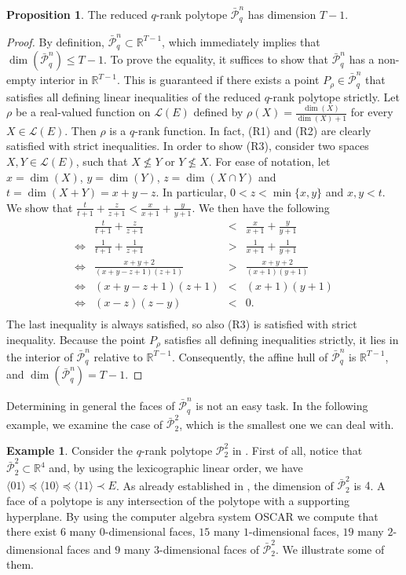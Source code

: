 \documentclass[a4paper,11pt,reqno]{amsart}
\theoremstyle{definition}
\newtheorem{example}[theorem]{{{Example}}}
\newtheorem{proposition}[theorem]{{{Proposition}}}
\newcommand{\mL}{\mathcal{L}}
\newcommand{\mP}{\mathcal{P}}
\newcommand{\la}{\langle}
\newcommand{\ra}{\rangle}
\newcommand{\rRP}{\bar{\mathcal{P}}_q^n}
\begin{document}
{\begin{proposition}\label{prop:dimension}
The reduced $q$-rank polytope $\rRP$ has dimension $T-1$.
\end{proposition}
\begin{proof}
By definition, $\rRP \subset \mathbb{R}^{T-1}$, which immediately implies that $\dim(\rRP) \le T-1$. To prove the equality, it suffices to show that $\rRP$ has a non-empty interior in $\mathbb{R}^{T-1}$. This is guaranteed if there exists a point $P_\rho \in \rRP$ that satisfies all defining linear inequalities of the reduced $q$-rank polytope strictly.
Let $\rho$ be a real-valued function on $\mL(E)$ defined by $\rho(X)=\frac{\dim(X)}{\dim(X)+1}$ for every $X\in\mL(E)$. Then $\rho$ is a $q$-rank function. In fact, (R1) and (R2) are clearly satisfied with strict inequalities. In order to show (R3), consider two spaces $X,Y\in\mL(E)$, such that $X\nleq Y$ or $Y\nleq X$. For ease of notation, let $x=\dim(X)$, $y=\dim(Y)$, $z=\dim(X\cap Y)$ and $t=\dim(X+Y) = x+y-z$. In particular, $0< z< \min\{x,y\}$ and $x,y<t$. We show that 
$\frac{t}{t+1} + \frac{z}{z+1} < \frac{x}{x+1} + \frac{y}{y+1}.$
We then have the following 
$$\begin{array}{cccc}
    & \frac{t}{t+1} + \frac{z}{z+1} & < & \frac{x}{x+1} + \frac{y}{y+1} \\
    \Leftrightarrow & \frac{1}{t+1} + \frac{1}{z+1} & > &\frac{1}{x+1} + \frac{1}{y+1}\\
    \Leftrightarrow & \frac{x+y+2}{(x+y-z+1)(z+1)} &> & \frac{x+y+2}{(x+1)(y+1)}\\
    \Leftrightarrow & (x+y-z+1)(z+1) &< &(x+1)(y+1)\\
    \Leftrightarrow & (x-z)(z-y) &<& 0.\\
\end{array}$$
The last inequality is always satisfied, so also (R3) is satisfied with strict inequality. 
Because the point $P_\rho$ satisfies all defining inequalities strictly, it lies in the interior of $\rRP$ relative to $\mathbb{R}^{T-1}$. Consequently, the affine hull of $\rRP$ is $\mathbb{R}^{T-1}$, and $\dim(\rRP) = T-1$.
\end{proof}


Determining in general the faces of $\rRP$ is not an easy task. In the following example, we examine the case of $\bar{\mathcal{P}}_2^2$, which is the smallest one we can deal with.

\begin{example}
Consider the $q$-rank polytope $\mP_2^2$ in . First of all, notice that $\bar{\mathcal{P}}_2^2\subset\mathbb{R}^4$ and, by using the lexicographic linear order, we have $\la 01\ra\preceq\la 10\ra\preceq\la 11\ra\prec E$. As already established in , the dimension of $\bar{\mathcal{P}}_2^2$ is $4$.     A face of a polytope is any intersection of the polytope with a supporting hyperplane. By using the computer algebra system \textsc{OSCAR} \cite{OSCAR} we compute that there exist $6$ many $0$-dimensional faces, $15$ many $1$-dimensional faces, $19$ many $2$-dimensional faces and $9$ many $3$-dimensional faces of $\bar{\mathcal{P}}_2^2$. We illustrate some of them.


\end{example}}
\end{document}
